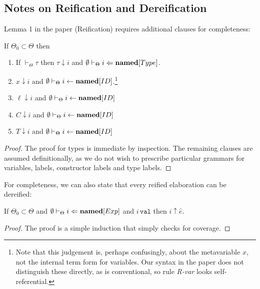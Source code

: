 \subsection{Notes on Reification and Dereification}
Lemma 1 in the paper (Reification) requires additional clauses for completeness:
\begin{lemma}
If $\Theta_0 \subset \Theta$ then
\begin{enumerate}
\item If $\vdash_\Theta \tau$ then $\tau \downarrow i$ and $\emptyset \vdash_\Theta i \Leftarrow \textbf{named}[Type]$.
\item $x \downarrow i$ and $\emptyset \vdash_\Theta i \leftarrow \textbf{named}[ID]$.\footnote{Note that this judgement is, perhaps confusingly, about the metavariable $x$, not the internal term form for variables. Our syntax in the paper does not distinguish these directly, as is conventional, so rule \textit{R-var} looks self-referential.}
\item $\ell \downarrow i$ and $\emptyset \vdash_\Theta i \leftarrow \textbf{named}[ID]$
\item $C \downarrow i$ and $\emptyset \vdash_\Theta i \leftarrow \textbf{named}[ID]$
\item $T \downarrow i$ and $\emptyset \vdash_\Theta i \leftarrow \textbf{named}[ID]$
\end{enumerate}
\end{lemma}
\begin{proof} The proof for types is immediate by inspection. The remaining clauses are assumed definitionally, as we do not wish to prescribe particular grammars for variables, labels, constructor labels and type labels.
\end{proof}
For completeness, we can also state that every reified elaboration can be dereified:
\begin{lemma}
If $\Theta_0 \subset \Theta$ and $\emptyset \vdash_\Theta i \Leftarrow \textbf{named}[Exp]$ and $i\,\mathtt{val}$ then $i \uparrow \hat{e}$.
\end{lemma}
\begin{proof}
The proof is a simple induction that simply checks for coverage.
\end{proof}

